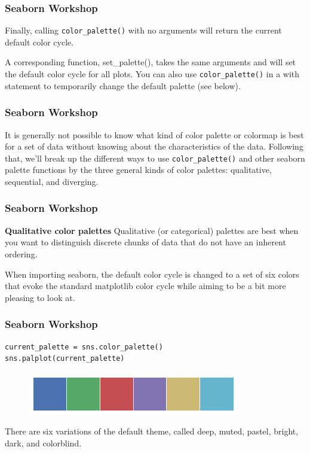 \documentclass{beamer}
\begin{document}
\begin{frame}[fragile]
\frametitle{Seaborn Workshop}
\large
Finally, calling \texttt{color\_palette()} with no arguments will return the current default color cycle.

A corresponding function, set\_palette(), takes the same arguments and will set the default color cycle for all plots. You can also use \texttt{color\_palette()} in a with statement to temporarily change the default palette (see below).
\end{frame}
\begin{frame}[fragile]
	\frametitle{Seaborn Workshop}
	\large
It is generally not possible to know what kind of color palette or colormap is best for a set of data without knowing about the characteristics of the data. Following that, we’ll break up the different ways to use \texttt{color\_palette()} and other seaborn palette functions by the three general kinds of color palettes: qualitative, sequential, and diverging.
\end{frame}
\begin{frame}[fragile]
\frametitle{Seaborn Workshop}
\large
\noindent \textbf{Qualitative color palettes}
Qualitative (or categorical) palettes are best when you want to distinguish discrete chunks of data that do not have an inherent ordering.

When importing seaborn, the default color cycle is changed to a set of six colors that evoke the standard matplotlib color cycle while aiming to be a bit more pleasing to look at.
\end{frame}
\begin{frame}[fragile]
	\frametitle{Seaborn Workshop}
	\large
\begin{verbatim}
current_palette = sns.color_palette()
sns.palplot(current_palette)
\end{verbatim}
\begin{figure}
\centering
\includegraphics[width=0.7\linewidth]{images/color_palettes_8_0}
\end{figure}

There are six variations of the default theme, called deep, muted, pastel, bright, dark, and colorblind.
\end{frame}
\end{document}
